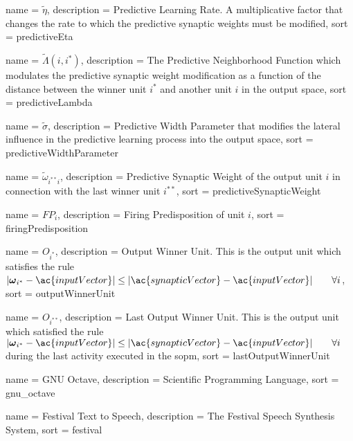 {
  name = {\ensuremath{\tilde{\eta}}},
  description = {Predictive Learning Rate. A multiplicative factor that changes the rate to which the predictive synaptic weights must be modified},
  sort  = predictiveEta
}

{
  name = {\ensuremath{\tilde{\Lambda}(i,i^*)}},
  description = {The Predictive Neighborhood Function which modulates the predictive synaptic weight modification as a function of the distance between the winner unit $i^*$ and another unit $i$ in the output space},
  sort  = predictiveLambda
}

{
  name = {\ensuremath{\tilde{\sigma}}},
  description = {Predictive Width Parameter that modifies the lateral influence in the predictive learning process into the output space},
  sort  = predictiveWidthParameter
}

{
  name = {\ensuremath{\tilde{\omega}_{i^{**}i}}},
  description = {Predictive Synaptic Weight of the output unit $i$ in connection with the last winner unit $i^{**}$},
  sort  = predictiveSynapticWeight
}

{
  name = {\ensuremath{FP_i}},
  description = {Firing Predisposition of unit $i$},
  sort  = firingPredisposition
}

{
  name = {\ensuremath{O_{i^*}}},
  description = {Output Winner Unit. This is the output unit which satisfies the rule $|\boldsymbol{\omega}_{i^*} - \ac{inputVector}| \leq |\ac{synapticVector} - \ac{inputVector}| \quad \quad \forall i$},
  sort  = outputWinnerUnit
}

{
  name = {\ensuremath{O_{i^{**}}}},
  description = {Last Output Winner Unit. This is the output unit which satisfied the rule $|\boldsymbol{\omega}_{i^*} - \ac{inputVector}| \leq |\ac{synapticVector} - \ac{inputVector}| \quad \quad \forall i$ during the last activity executed in the \ac{sopm}},
  sort  = lastOutputWinnerUnit
}

{
  name = {GNU Octave},
  description = {Scientific Programming Language},
  sort  = gnu_octave
}

{
  name = {Festival Text to Speech},
  description = {The Festival Speech Synthesis System},
  sort  = festival
}


